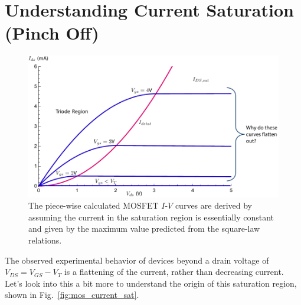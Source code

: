 \section{Understanding Current Saturation (Pinch Off)}
\begin{figure}[tb]
\centering
\includegraphics[width=.75\columnwidth]{ids_idsat_full} 
\caption{The piece-wise calculated MOSFET $I$-$V$ curves are derived by assuming the current in the saturation region is essentially constant and given by the maximum value predicted from the square-law relations.}
\label{fig:ids_triode_only}
\end{figure}
The observed experimental behavior of devices beyond a drain voltage of $V_{DS} = V_{GS} - V_T$ is a flattening of the current, rather than decreasing current.  Let's look into this a bit more to understand the origin of this saturation region, shown in Fig.~\ref{fig:mos_current_sat}.
